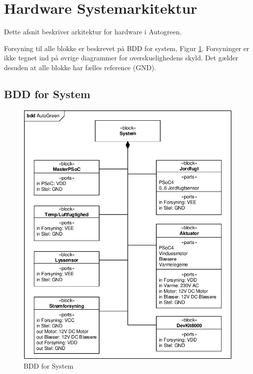 \section{Hardware Systemarkitektur}
Dette afsnit beskriver arkitektur for hardware i Autogreen.

Forsyning til alle blokke er beskrevet på BDD for system, Figur \ref{fig:bdd_system}. Forsyninger er ikke tegnet ind på øvrige diagrammer for overskuelighedens skyld. Det gælder desuden at alle blokke har fælles reference (GND). 

\clearpage

\subsection{BDD for System}
\begin{figure}[h]
\centering 
\includegraphics[width={\textwidth-2cm}, trim=0 0 0 0, clip=true] {../fig/bdd_system.pdf}
\caption{BDD for System}
\label{fig:bdd_system}
\end{figure}
\clearpage

